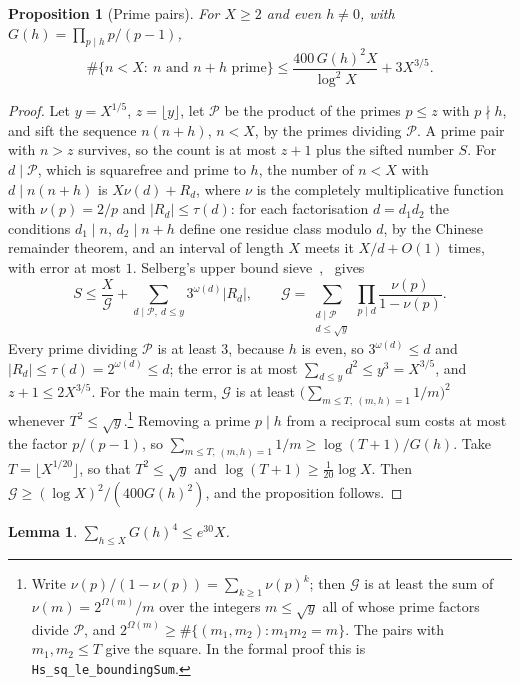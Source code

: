 \documentclass[11pt]{amsart}
\newtheorem{proposition}[theorem]{Proposition}
\newtheorem{lemma}[theorem]{Lemma}
\theoremstyle{definition}
\theoremstyle{remark}
\numberwithin{equation}{section}
\newcommand{\e}{e}
\begin{document}
\begin{proposition}[Prime pairs]\label{prop:pairs}
For $X\ge2$ and even $h\ne0$, with $G(h)=\prod_{p\mid h}p/(p-1)$,
\[
\#\{n<X:\ n\text{ and }n+h\text{ prime}\}\le\frac{400\,G(h)^2X}{\log^2X}+3X^{3/5}.
\]
\end{proposition}

\begin{proof}
Let $y=X^{1/5}$, $z=\lfloor y\rfloor$, let $\mathcal P$ be the product of the primes
$p\le z$ with $p\nmid h$, and sift the sequence $n(n+h)$, $n<X$, by the primes
dividing $\mathcal P$. A prime pair with $n>z$ survives, so the count is at most
$z+1$ plus the sifted number $S$. For $d\mid\mathcal P$, which is squarefree and
prime to $h$, the number of $n<X$ with $d\mid n(n+h)$ is $X\nu(d)+R_d$, where
$\nu$ is the completely multiplicative function with $\nu(p)=2/p$ and
$|R_d|\le\tau(d)$: for each factorisation $d=d_1d_2$ the conditions $d_1\mid n$,
$d_2\mid n+h$ define one residue class modulo $d$, by the Chinese remainder
theorem, and an interval of length $X$ meets it $X/d+O(1)$ times, with error at
most $1$. Selberg's upper bound sieve~\cite{selberg47},~\cite[Theorem~3.2]{hr74} gives
\[
S\le\frac X{\mathcal G}+\sum_{d\mid\mathcal P,\ d\le y}3^{\omega(d)}|R_d|,\qquad\mathcal G=\sum_{\substack{d\mid\mathcal
P\\ d\le\sqrt y}}\prod_{p\mid d}\frac{\nu(p)}{1-\nu(p)} .
\]
Every prime dividing $\mathcal P$ is at least $3$, because $h$ is even, so
$3^{\omega(d)}\le d$ and $|R_d|\le\tau(d)=2^{\omega(d)}\le d$; the error is at
most $\sum_{d\le y}d^2\le y^3=X^{3/5}$, and $z+1\le2X^{3/5}$. For the main term,
$\mathcal G$ is at least $\bigl(\sum_{m\le T,\ (m,h)=1}1/m\bigr)^2$ whenever
$T^2\le\sqrt y$.\footnote{Write $\nu(p)/(1-\nu(p))=\sum_{k\ge1}\nu(p)^k$; then
$\mathcal G$ is at least the sum of $\nu(m)=2^{\Omega(m)}/m$ over the integers
$m\le\sqrt y$ all of whose prime factors divide $\mathcal P$, and
$2^{\Omega(m)}\ge\#\{(m_1,m_2):m_1m_2=m\}$. The pairs with $m_1,m_2\le T$ give the
square. In the formal proof this is \texttt{Hs\_sq\_le\_boundingSum}.} Removing a
prime $p\mid h$ from a reciprocal sum costs at most the factor $p/(p-1)$, so
$\sum_{m\le T,\,(m,h)=1}1/m\ge\log(T+1)/G(h)$. Take $T=\lfloor X^{1/20}\rfloor$, so
that $T^2\le\sqrt y$ and $\log(T+1)\ge\frac1{20}\log X$. Then $\mathcal G\ge(\log
X)^2/(400G(h)^2)$, and the proposition follows.
\end{proof}

\begin{lemma}\label{lem:G4}
$\sum_{h\le X}G(h)^4\le\e^{30}X$.
\end{lemma}
\end{document}
